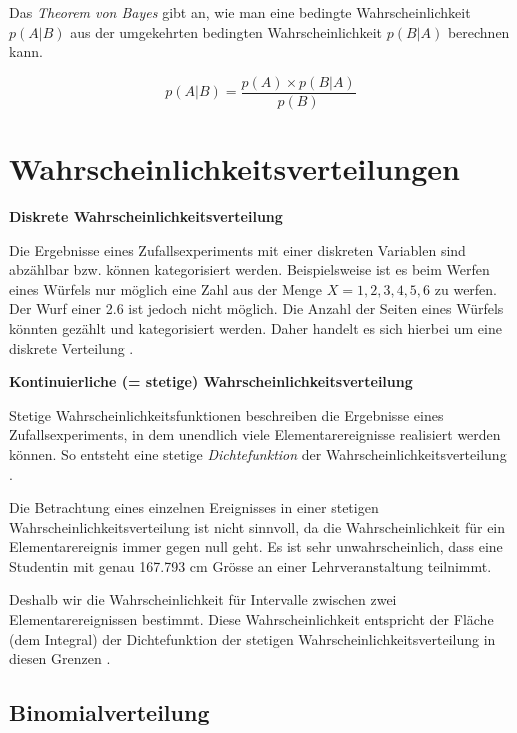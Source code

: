 \documentclass[
]{book}
\begin{document}
Das \emph{Theorem von Bayes} gibt an, wie man eine bedingte Wahrscheinlichkeit \(p(A|B)\) aus der umgekehrten bedingten Wahrscheinlichkeit \(p(B|A)\) berechnen kann.

\begin{equation}
  p(A|B)= \frac{p(A) \times p(B|A)}{p(B)}
  \label{eq:bayes}
\end{equation}

\hypertarget{wahrscheinlichkeitsverteilungen}{%
\chapter{Wahrscheinlichkeitsverteilungen}\label{wahrscheinlichkeitsverteilungen}}

\textbf{Diskrete Wahrscheinlichkeitsverteilung}

Die Ergebnisse eines Zufallsexperiments mit einer diskreten Variablen sind abzählbar
bzw. können kategorisiert werden. Beispielsweise ist es beim Werfen eines Würfels
nur möglich eine Zahl aus der Menge \(X = {1, 2, 3, 4, 5, 6}\) zu werfen. Der Wurf einer
2.6 ist jedoch nicht möglich. Die Anzahl der Seiten eines Würfels könnten gezählt und kategorisiert werden. Daher handelt es sich hierbei um eine diskrete Verteilung \citep{Leonhart2013}.

\textbf{Kontinuierliche (= stetige) Wahrscheinlichkeitsverteilung}

Stetige Wahrscheinlichkeitsfunktionen beschreiben die Ergebnisse eines Zufallsexperiments, in dem unendlich viele Elementarereignisse realisiert werden können. So entsteht eine stetige \emph{Dichtefunktion} der Wahrscheinlichkeitsverteilung \citep{Leonhart2013}.

Die Betrachtung eines einzelnen Ereignisses in einer stetigen Wahrscheinlichkeitsverteilung ist nicht sinnvoll, da die Wahrscheinlichkeit für ein Elementarereignis immer gegen null geht. Es ist sehr unwahrscheinlich, dass eine Studentin mit genau 167.793 cm Grösse an einer Lehrveranstaltung teilnimmt.

Deshalb wir die Wahrscheinlichkeit für Intervalle zwischen zwei Elementarereignissen bestimmt. Diese Wahrscheinlichkeit entspricht der Fläche (dem Integral) der Dichtefunktion der stetigen Wahrscheinlichkeitsverteilung in diesen Grenzen \citep{Leonhart2013}.

\hypertarget{binomialverteilung}{%
\section{Binomialverteilung}\label{binomialverteilung}}
\end{document}
